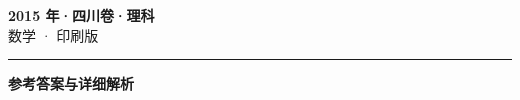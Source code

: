 \documentclass[zihao=5, a4paper]{ctexart}
\begin{document}
\begin{center}
  {\Large\bfseries 2015 年·四川卷·理科}\\[4pt]
  {\large 数学 · 印刷版}
\end{center}
\medskip
{}

\par\bigskip\hrule\bigskip
{}
\begin{center}{\large\bfseries 参考答案与详细解析}\end{center}
\smallskip

\end{document}
